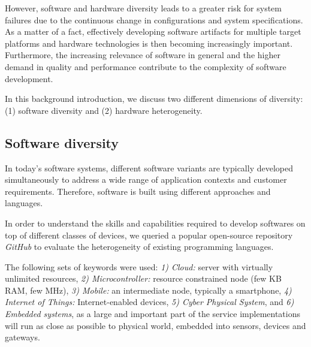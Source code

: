 However, software and hardware diversity leads to a greater risk for system failures due to the continuous change in configurations and system specifications.
As a matter of a fact, effectively developing software artifacts for multiple target platforms and hardware technologies is then becoming increasingly important.
Furthermore, the increasing relevance of software in general and the higher demand in quality and performance contribute to the complexity of software development.

In this background introduction, we discuss two different dimensions of diversity: (1) software diversity and (2) hardware heterogeneity.

 
 
\subsection{Software diversity}
In today's software systems, different software variants are typically developed simultaneously to address a wide range of application contexts and customer requirements\cite{schaefer2012software}. 
Therefore, software is built using different approaches and languages. 

In order to understand the skills and capabilities required to develop softwares on top of different classes of devices, we queried a popular open-source repository \textit{GitHub} to evaluate the heterogeneity of existing programming languages. 

The following sets of keywords were used: \textit{1) Cloud:} server with virtually unlimited resources, \textit{2) Microcontroller:} resource constrained node (few KB RAM, few MHz),  \textit{3) Mobile:} an intermediate node, typically a smartphone,  \textit{4) Internet of Things:} Internet-enabled devices,  \textit{5) Cyber Physical System}, and  \textit{6) Embedded systems}, as a large and important part of the service implementations will run as close as possible to physical world, embedded into sensors, devices and gateways.

